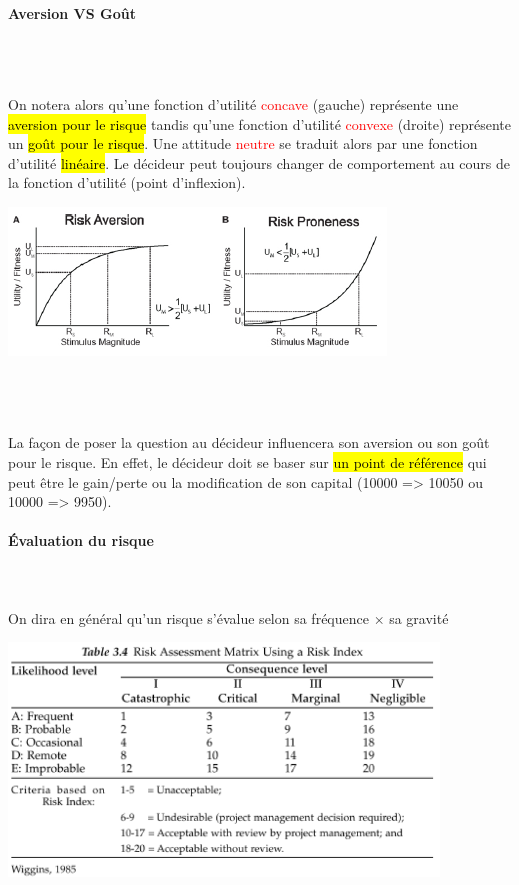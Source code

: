 \documentclass[a4paper, 12pt]{article}
\newcommand{\alinea}{
\hspace*{0.5cm}}
\newcommand{\red}[1]{
	\textcolor{red}{#1}}
\begin{document}
			\paragraph{Aversion VS Goût}~\\~\\
				\begin{minipage}{0.6\textwidth}
					\alinea On notera alors qu'une fonction d'utilité \red{concave} (gauche) représente une 
					\hl{aversion pour le risque} tandis 
					qu'une fonction d'utilité \red{convexe} (droite) représente un \hl{goût pour le risque}. Une attitude \red{neutre} 
					se traduit alors par une fonction d'utilité \hl{linéaire}. Le décideur peut toujours changer de comportement au cours 
					de la fonction d'utilité (point d'inflexion).
				\end{minipage}\hfill
				\begin{minipage}{0.33\textwidth}
					\includegraphics[width=\textwidth]{Images/aversion_gout}
				\end{minipage}~\\~\\~\\
				\alinea La façon de poser la question au décideur influencera son aversion ou son goût pour le risque. En effet,
					le décideur doit se baser sur \hl{un point de référence} qui peut être le gain/perte ou la modification de 
					son capital (10000 => 10050 ou 10000 => 9950).
			\paragraph{\'Evaluation du risque} ~\\~\\
				\alinea On dira en général qu'un risque s'évalue selon sa fréquence $\times$ sa gravité
				\begin{center}
					\includegraphics[width=4.5in]{Images/evaluation_risque}
				\end{center}
%
\end{document}
